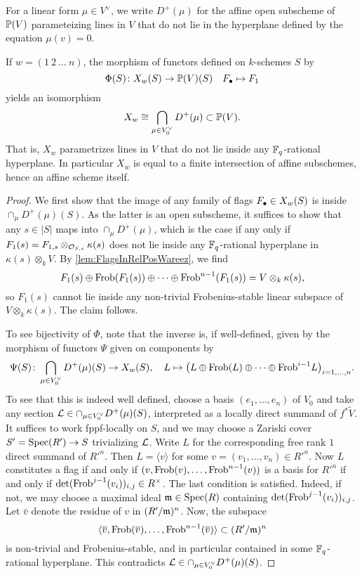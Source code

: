 \documentclass[../main.tex]{subfiles}
\begin{document}
For a linear form $\mu \in V^\vee$, we write
$D^+(\mu)$ for the affine open subscheme of $\mathbb{P}(V)$ parameteizing
lines in $V$ that do not lie in the hyperplane defined by the equation $\mu(v) = 0$.

\begin{prop}\label{prop:XwExplicitely}
  If $w = (1 \ 2 \ \dots \ n)$, the morphism of functors defined on 
  $k$-schemes $S$ by
  \begin{equation*}
    \Phi(S)\colon  X_w(S) \to \mathbb{P}(V)(S) \quad F_\bullet \mapsto F_1
  \end{equation*}
  yields an isomorphism 
  $$X_w \cong \bigcap_{\mu \in V_0^\vee} D^+(\mu) \subset \mathbb{P}(V).$$
  That is, $X_w$ parametrizes lines in $V$ that do not lie inside any
  $\mathbb{F}_q$-rational hyperplane. In particular $X_w$ is equal to a finite
  intersection of affine subschemes, hence an affine scheme itself.
  \begin{proof} 
  We first show that the image of any family of flags $F_\bullet \in X_w(S)$ is inside $\cap_{\mu} D^+(\mu)(S)$. As the latter is an open subscheme, it suffices to
  show that any $s \in |S|$ maps into
  $\cap_{\mu} D^+(\mu)$, which is the case if any only if $F_1(s) = F_{1,s}
  \otimes_{\mathcal{O}_{S,s}} \kappa(s)$  does not lie inside
  any $\mathbb{F}_q$-rational hyperplane in $\kappa(s) \otimes_k V$. By 
  \cref{lem:FlagsInRelPosWareez}, we find
  $$F_1(s) \oplus \mathrm{Frob}(F_1(s)) \oplus \dots \oplus \mathrm{Frob}^{n-1}(F_1(s)) = V
  \otimes_k \kappa(s),$$
  so $F_1(s)$ cannot lie inside any non-trivial Frobenius-stable linear subspace
  of $V \otimes_k \kappa(s)$. The claim follows. 

  To see bijectivity of $\Phi$, note that the inverse is, if well-defined,
  given by the morphism of functors $\Psi$ given on components by 
  \begin{equation*}
    \Psi(S)\colon  \bigcap_{\mu \in V_0^\vee}D^+(\mu)(S) \to X_w(S), \quad L \mapsto 
    \big(L \oplus \mathrm{Frob}(L) \oplus \dots \oplus \mathrm{Frob}^{i-1} L\big)_{i = 1, \dots, n}.
  \end{equation*}
  To see that this is indeed well defined, choose a basis $(e_1, \dots, e_n)$
  of $V_0$ and take any section $\mathcal{L} \in \cap_{\mu \in
  V_0^\vee}D^+(\mu)(S)$, interpreted as a locally direct summand of $f^* \tilde V$. 
  It suffices to work fppf-locally on $S$, and we may choose a Zariski cover $S' = \operatorname{Spec}(R') \to S$ trivializing $\mathcal{L}$.
  Write $L$ for the corresponding free rank $1$ direct summand of $R'^n$. Then
  $L = \langle v \rangle$ for some $v = (v_1, \dots, v_n) \in R'^n$. Now $L$ constitutes a flag if and only if $(v, \mathrm{Frob}(v), \dots, \mathrm{Frob}^{n-1}(v))$
  is a basis for $R'^n$ if and only if $\det(\mathrm{Frob}^{j-1}(v_i))_{i,j} \in R^\times$.
  The last condition is satisfied. Indeed, if not, we may 
  choose a maximal ideal $\mathfrak{m} \in \operatorname{Spec}(R)$ containing
  $\det(\mathrm{Frob}^{j-1}(v_i))_{i,j}$. Let $\bar v$ denote the residue of $v$ in
  $(R'/\mathfrak{m})^n$. Now, the subspace
  $$\langle \overline v, \mathrm{Frob}(\overline v), \dots, \mathrm{Frob}^{n-1}(\overline v)\rangle \subset (R'/\mathfrak{m})^n$$ 
  is non-trivial and Frobenius-stable, and in particular
  contained in some $\mathbb{F}_q$-rational hyperplane. This contradicts $\mathcal{L} \in
  \cap_{\mu \in V_0^\vee}D^+(\mu)(S)$. 
\end{proof}
\end{prop}
\end{document}
